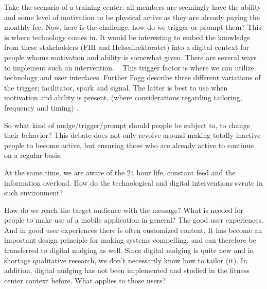 Take the scenario of a training center: all members are seemingly have the ability and some level of motivation to be physical active as they are already paying the monthly fee. Now, here is the challenge, how do we trigger or prompt them? This is where technology comes in. It would be interesting to embed the knowledge from these stakeholders (FHI and Helsedirektoratet) into a digital context for people whoms motivation and ability is somewhat given. There are several ways to implement such an intervention. 
 
This trigger factor is where we can utilize technology and user interfaces. Further Fogg describe three different variations of the trigger; facilitator, spark and signal. The latter is best to use when motivation and ability is present, (where considerations regarding tailoring, frequency and timing) \cite{fogg_persuasive_2003}.


So what kind of nudge/trigger/prompt should people be subject to, to change their behavior? This debate does not only revolve around making totally inactive people to become active, but ensuring those who are already active to continue on a regular basis. 

At the same time, we are aware of the 24 hour life, constant feed and the information overload. How do the technological and digital interventions svrute in such environment? 

How do we reach the target audience with the message? What is needed for people to make use of a mobile application in general? The good user experiences. And in good user experiences there is often customized content. It has become an important design principle for making systems compelling, and can therefore be transferred to digital nudging as well. Since digital nudging is quite new and in shortage  qualitative research, we don't necessarily know how to tailor (it). In addition, digital nudging has not been implemented and studied in the fitness center context before. What applies to those users?

